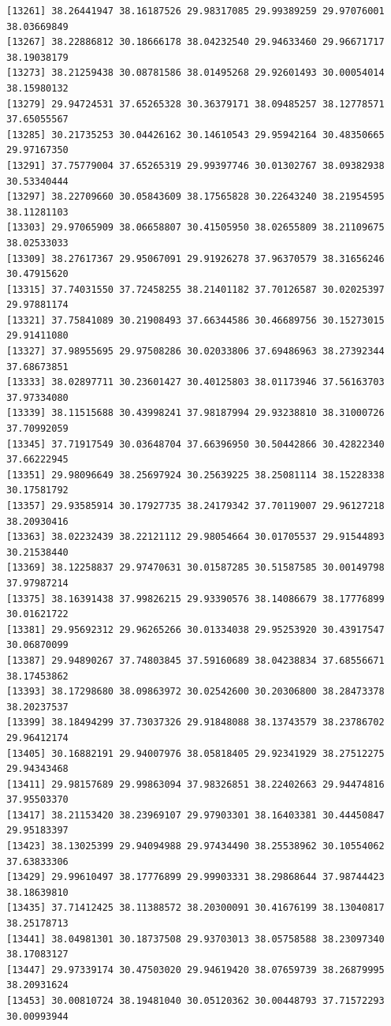 \documentclass[
  letterpaper,
  DIV=11,
  numbers=noendperiod]{scrartcl}
\begin{document}
\begin{verbatim}
[13261] 38.26441947 38.16187526 29.98317085 29.99389259 29.97076001 38.03669849
[13267] 38.22886812 30.18666178 38.04232540 29.94633460 29.96671717 38.19038179
[13273] 38.21259438 30.08781586 38.01495268 29.92601493 30.00054014 38.15980132
[13279] 29.94724531 37.65265328 30.36379171 38.09485257 38.12778571 37.65055567
[13285] 30.21735253 30.04426162 30.14610543 29.95942164 30.48350665 29.97167350
[13291] 37.75779004 37.65265319 29.99397746 30.01302767 38.09382938 30.53340444
[13297] 38.22709660 30.05843609 38.17565828 30.22643240 38.21954595 38.11281103
[13303] 29.97065909 38.06658807 30.41505950 38.02655809 38.21109675 38.02533033
[13309] 38.27617367 29.95067091 29.91926278 37.96370579 38.31656246 30.47915620
[13315] 37.74031550 37.72458255 38.21401182 37.70126587 30.02025397 29.97881174
[13321] 37.75841089 30.21908493 37.66344586 30.46689756 30.15273015 29.91411080
[13327] 37.98955695 29.97508286 30.02033806 37.69486963 38.27392344 37.68673851
[13333] 38.02897711 30.23601427 30.40125803 38.01173946 37.56163703 37.97334080
[13339] 38.11515688 30.43998241 37.98187994 29.93238810 38.31000726 37.70992059
[13345] 37.71917549 30.03648704 37.66396950 30.50442866 30.42822340 37.66222945
[13351] 29.98096649 38.25697924 30.25639225 38.25081114 38.15228338 30.17581792
[13357] 29.93585914 30.17927735 38.24179342 37.70119007 29.96127218 38.20930416
[13363] 38.02232439 38.22121112 29.98054664 30.01705537 29.91544893 30.21538440
[13369] 38.12258837 29.97470631 30.01587285 30.51587585 30.00149798 37.97987214
[13375] 38.16391438 37.99826215 29.93390576 38.14086679 38.17776899 30.01621722
[13381] 29.95692312 29.96265266 30.01334038 29.95253920 30.43917547 30.06870099
[13387] 29.94890267 37.74803845 37.59160689 38.04238834 37.68556671 38.17453862
[13393] 38.17298680 38.09863972 30.02542600 30.20306800 38.28473378 38.20237537
[13399] 38.18494299 37.73037326 29.91848088 38.13743579 38.23786702 29.96412174
[13405] 30.16882191 29.94007976 38.05818405 29.92341929 38.27512275 29.94343468
[13411] 29.98157689 29.99863094 37.98326851 38.22402663 29.94474816 37.95503370
[13417] 38.21153420 38.23969107 29.97903301 38.16403381 30.44450847 29.95183397
[13423] 38.13025399 29.94094988 29.97434490 38.25538962 30.10554062 37.63833306
[13429] 29.99610497 38.17776899 29.99903331 38.29868644 37.98744423 38.18639810
[13435] 37.71412425 38.11388572 38.20300091 30.41676199 38.13040817 38.25178713
[13441] 38.04981301 30.18737508 29.93703013 38.05758588 38.23097340 38.17083127
[13447] 29.97339174 30.47503020 29.94619420 38.07659739 38.26879995 38.20931624
[13453] 30.00810724 38.19481040 30.05120362 30.00448793 37.71572293 30.00993944

\end{verbatim}
\end{document}
